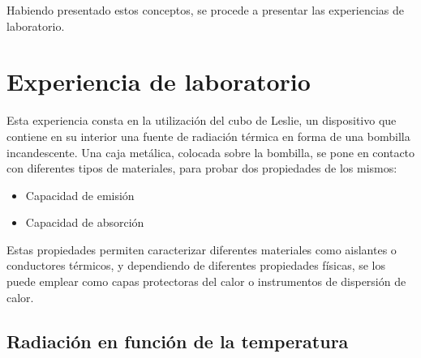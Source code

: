 \documentclass[a4paper,12pt]{report}
\begin{document}
  Habiendo presentado estos conceptos, se procede a presentar las experiencias de laboratorio.

\chapter{Experiencia de laboratorio}
  Esta experiencia consta en la utilización del cubo de Leslie, un dispositivo que contiene en su interior una fuente
  de radiación térmica en forma de una bombilla incandescente. Una caja metálica, colocada sobre la bombilla, se pone
  en contacto con diferentes tipos de materiales, para probar dos propiedades de los mismos:
  \begin{itemize}
    \item Capacidad de emisión
    \item Capacidad de absorción
  \end{itemize}

  Estas propiedades permiten caracterizar diferentes materiales como aislantes o conductores térmicos, y dependiendo de
  diferentes propiedades físicas, se los puede emplear como capas protectoras del calor o instrumentos de dispersión de
  calor.

  \section{Radiación en función de la temperatura}

  \begin{center}
  \end{center}

  \begin{center}
  \end{center}
\end{document}
